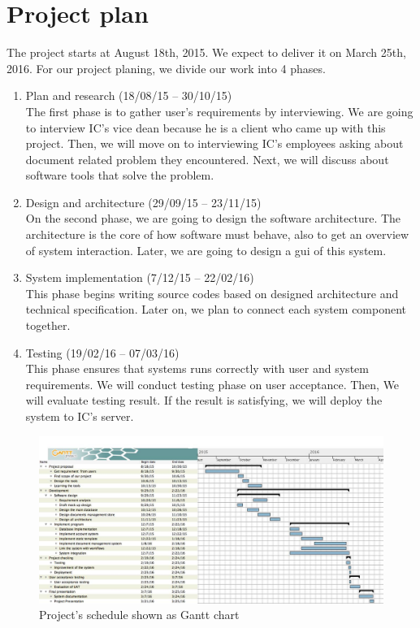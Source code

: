 \section{Project plan}
The project starts at August 18th, 2015.
We expect to deliver it on March 25th, 2016.
For our project planing, we divide our work into 4 phases.
\begin{enumerate}
\item Plan and research (18/08/15 -- 30/10/15) \hfill \\
The first phase is to gather user's requirements by interviewing.
We are going to interview IC's vice dean because he is a client who came up with this project.
Then, we will move on to interviewing IC's employees asking about document related problem they encountered.
Next, we will discuss about software tools that solve the problem.
\item Design and architecture (29/09/15 -- 23/11/15) \hfill \\
On the second phase, we are going to design the software architecture.
The architecture is the core of how software must behave, also to get an overview of system interaction.
Later, we are going to design a \gls{gui} of this system.
\item System implementation (7/12/15 -- 22/02/16) \hfill \\
This phase begins writing source codes based on designed architecture and technical specification.
Later on, we plan to connect each system component together.
\item Testing (19/02/16 -- 07/03/16) \hfill \\
This phase ensures that systems runs correctly with user and system requirements.
We will conduct testing phase on user acceptance.
Then, We will evaluate testing result.
If the result is satisfying, we will deploy the system to IC's server.
\end{enumerate}

\begin{landscape}
\begin{figure}
\centering
\caption{Project's schedule shown as Gantt chart}
\label{fig:project-schedule}
\includegraphics[scale=0.4]{res/project_plan}
\end{figure}
\end{landscape}